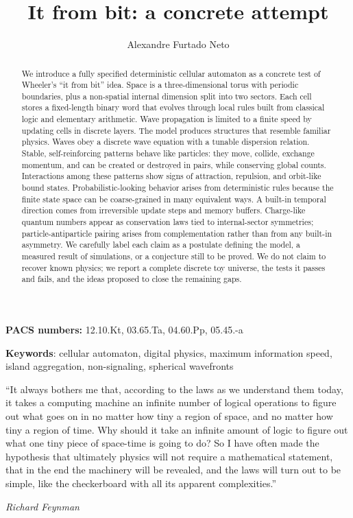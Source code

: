 \documentclass{ijuc}
\begin{document}
\title{It from bit: a concrete attempt}
\author{Alexandre Furtado Neto
}
\def\received{\today}
\maketitle
\begin{abstract}
\sloppy
We introduce a fully specified deterministic cellular automaton as a concrete test of Wheeler's ``it from bit'' idea. Space is a three-dimensional torus with periodic boundaries, plus a non-spatial internal dimension split into two sectors. Each cell stores a fixed-length binary word that evolves through local rules built from classical logic and elementary arithmetic. Wave propagation is limited to a finite speed by updating cells in discrete layers.
The model produces structures that resemble familiar physics. Waves obey a discrete wave equation with a tunable dispersion relation. Stable, self-reinforcing patterns behave like particles: they move, collide, exchange momentum, and can be created or destroyed in pairs, while conserving global counts. Interactions among these patterns show signs of attraction, repulsion, and orbit-like bound states. Probabilistic-looking behavior arises from deterministic rules because the finite state space can be coarse-grained in many equivalent ways. A built-in temporal direction comes from irreversible update steps and memory buffers. Charge-like quantum numbers appear as conservation laws tied to internal-sector symmetries; particle-antiparticle pairing arises from complementation rather than from any built-in asymmetry.
We carefully label each claim as a postulate defining the model, a measured result of simulations, or a conjecture still to be proved. We do not claim to recover known physics; we report a complete discrete toy universe, the tests it passes and fails, and the ideas proposed to close the remaining gaps.
\medskip{}
\end{abstract}
\vfill
\begin{center}
\textbf{PACS numbers: }12.10.Kt, 03.65.Ta, 04.60.Pp, 05.45.-a
\par\end{center}
\begin{center}
\textbf{Keywords}: cellular automaton, digital physics, maximum information speed, island aggregation, non-signaling, spherical wavefronts
\par\end{center}
\newpage
\epigraph{``It always bothers me that, according to the laws as we understand them today, it takes a computing machine an infinite number of logical operations to figure out what goes on in no matter how tiny a region of space, and no matter how tiny a region of time. Why should it take an infinite amount of logic to figure out what one tiny piece of space-time is going to do? So I have often made the hypothesis that ultimately physics will not require a mathematical statement, that in the end the machinery will be revealed, and the laws will turn out to be simple, like the checkerboard with all its apparent complexities.''}{\textit{Richard Feynman}}
\end{document}
